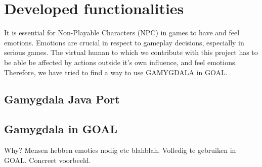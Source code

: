 \section{Developed functionalities}
It is essential for Non-Playable Characters (NPC) in games to have and feel emotions. Emotions are crucial in respect to gameplay decisions, especially in serious games. The virtual human to which we contribute with this project has to be able be affected by actions outside it's own influence, and feel emotions. Therefore, we have tried to find a way to use GAMYGDALA \citep{gamygdala} in GOAL.

\subsection{Gamygdala Java Port}


\subsection{Gamygdala in GOAL}
Why? Mensen hebben emoties nodig etc blahblah.
Volledig te gebruiken in GOAL.
Concreet voorbeeld.